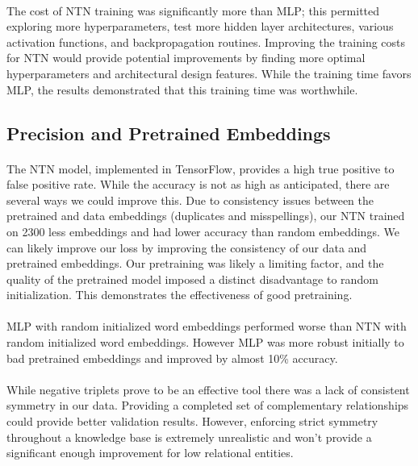 \documentclass[11.5pt]{article}
\begin{document}
\paragraph{}The cost of NTN training was significantly more than MLP; this permitted exploring more hyperparameters, test more hidden layer architectures, various activation functions, and backpropagation routines. Improving the training costs for NTN would provide potential improvements by finding more optimal hyperparameters and architectural design features. While the training time favors MLP, the results demonstrated that this training time was worthwhile.

\subsection{Precision and Pretrained Embeddings}
\paragraph{} The NTN model, implemented in  TensorFlow, provides a high true positive to false positive rate. While the accuracy is not as high as anticipated, there are several ways we could improve this. Due to consistency issues between the pretrained and data embeddings (duplicates and misspellings), our NTN trained on 2300 less embeddings and had lower accuracy than random embeddings. We can likely improve our loss by improving the consistency of our data and pretrained embeddings. Our pretraining was likely a limiting factor, and the quality of the pretrained model imposed a distinct disadvantage to random initialization. This demonstrates the effectiveness of good pretraining.

\paragraph{} MLP with random initialized word embeddings performed worse than NTN with random initialized word embeddings. However MLP was more robust initially to bad pretrained embeddings and improved by almost 10\% accuracy. 

\paragraph{} While negative triplets prove to be an effective tool there was a lack of consistent symmetry in our data. Providing a completed set of complementary relationships could provide better validation results. However, enforcing strict symmetry throughout a knowledge base is extremely unrealistic and won't provide a significant enough improvement for low relational entities.
\end{document}
